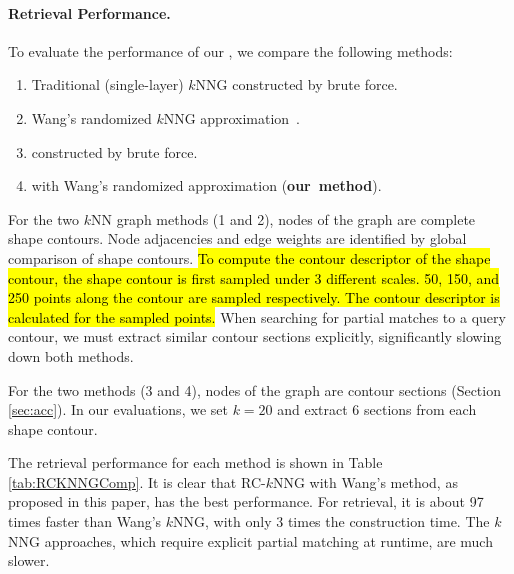 \paragraph*{{\RCKNNG} Retrieval Performance.} To evaluate the performance of our {\RCKNNG}, we compare the following methods:
\begin{enumerate}
\setlength{\itemsep}{3pt}
\setlength{\parskip}{0pt}
\setlength{\parsep}{0pt}
\item Traditional (single-layer) $k$NNG constructed by brute force.
\item Wang's randomized $k$NNG approximation~\cite{scalableknnjingwangcvpr2012}.
\item {\RCKNNG} constructed by brute force.
\item {\RCKNNG} with Wang's randomized approximation (\mbox{\textbf{our method}}).
\end{enumerate}
For the two $k$NN graph methods (1 and 2), nodes of the graph are complete shape contours. Node adjacencies and edge weights are identified by global comparison of shape contours. \hl{To compute the contour descriptor of the shape contour, the shape contour is first sampled under 3 different scales. 50, 150, and 250 points along the contour are sampled respectively. The contour descriptor is calculated for the sampled points.} When searching for partial matches to a query contour, we must extract similar contour sections explicitly, significantly slowing down both methods.

For the two {\RCKNNG} methods (3 and 4), nodes of the graph are contour sections (Section \ref{sec:acc}). In our evaluations, we set $k = 20$  and extract $6$ sections from each shape contour.

The retrieval performance for each method is shown in Table \ref{tab:RCKNNGComp}. It is clear that RC-$k$NNG with Wang's method, as proposed in this paper, has the best performance. For retrieval, it is about 97 times faster than Wang's $k$NNG, with only 3 times the construction time. The $k$NNG approaches, which require explicit partial matching at runtime, are much slower.

